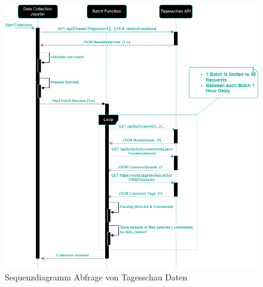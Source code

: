 \begin{figure}
    \centering
    \includegraphics[width=1\linewidth]{abbildungen/image.png}
    \caption{Sequenzdiagramm Abfrage von Tagesschau Daten}
    \label{fig:Sequenzdiagramm Abfrage von Tagesschau Daten}
\end{figure}